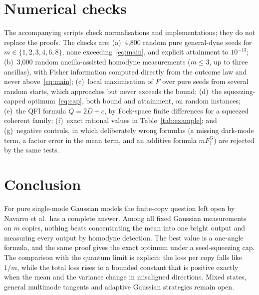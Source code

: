 \documentclass[11pt,a4paper]{article}
\theoremstyle{definition}\newtheorem{definition}{Definition}
\theoremstyle{remark}\newtheorem{remark}{Remark}
\begin{document}
\section{Numerical checks}\label{sec:repro}
The accompanying scripts check normalisations and implementations; they do not replace the proofs. The checks are: (a)~4{,}800 random pure general-dyne seeds for $m\in\{1,2,3,4,6,8\}$, none exceeding~\eqref{eq:main}, and explicit attainment to $10^{-13}$; (b)~3{,}000 random ancilla-assisted homodyne measurements ($m\le3$, up to three ancillas), with Fisher information computed directly from the outcome law and never above~\eqref{eq:main}; (c)~local maximisation of $F$ over pure seeds from several random starts, which approaches but never exceeds the bound; (d)~the squeezing-capped optimum~\eqref{eq:cap}, both bound and attainment, on random instances; (e)~the QFI formula $Q=2D+c$, by Fock-space finite differences for a squeezed coherent family; (f)~exact rational values in Table~\ref{tab:example}; and (g)~negative controls, in which deliberately wrong formulas (a missing dark-mode term, a factor error in the mean term, and an additive formula $mF_1^G$) are rejected by the same tests.

\section{Conclusion}
For pure single-mode Gaussian models the finite-copy question left open by Navarro et al.\ has a complete answer. Among all fixed Gaussian measurements on $m$ copies, nothing beats concentrating the mean into one bright output and measuring every output by homodyne detection. The best value is a one-angle formula, and the same proof gives the exact optimum under a seed-squeezing cap. The comparison with the quantum limit is explicit: the loss per copy falls like $1/m$, while the total loss rises to a bounded constant that is positive exactly when the mean and the variance change in misaligned directions. Mixed states, general multimode tangents and adaptive Gaussian strategies remain open.
\end{document}
